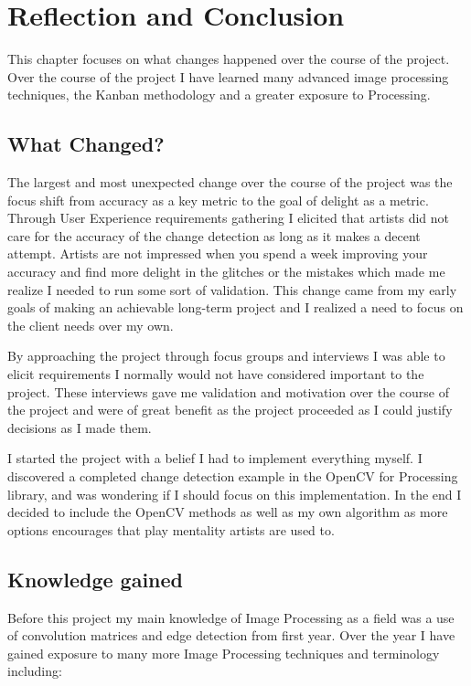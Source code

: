 \documentclass[a4paper]{report}
\begin{document}
\chapter{Reflection and Conclusion}
This chapter focuses on what changes happened over the course of the project. Over the course of the project I have learned many advanced image processing techniques, the Kanban methodology and a greater exposure to Processing. 

\section{What Changed?}
The largest and most unexpected change over the course of the project was the focus shift from accuracy as a key metric to the goal of delight as a metric. Through User Experience requirements gathering I elicited that artists did not care for the accuracy of the change detection as long as it makes a decent attempt. Artists are not impressed when you spend a week improving your accuracy and find more delight in the glitches or the mistakes which made me realize I needed to run some sort of validation. This change came from my early goals of making an achievable long-term project and I realized a need to focus on the client needs over my own.

By approaching the project through focus groups and interviews I was able to elicit requirements I normally would not have considered important to the project. These interviews gave me validation and motivation over the course of the project and were of great benefit as the project proceeded as I could justify decisions as I made them.

I started the project with a belief I had to implement everything myself. I discovered a completed change detection example in the OpenCV for Processing \cite{OPENCV} library, and was wondering if I should focus on this implementation. In the end I decided to include the OpenCV methods as well as my own algorithm as more options encourages that play mentality artists are used to.

\section{Knowledge gained}
Before this project my main knowledge of Image Processing as a field was a use of convolution matrices and edge detection from first year. Over the year I have gained exposure to many more Image Processing techniques and terminology including:
\end{document}
